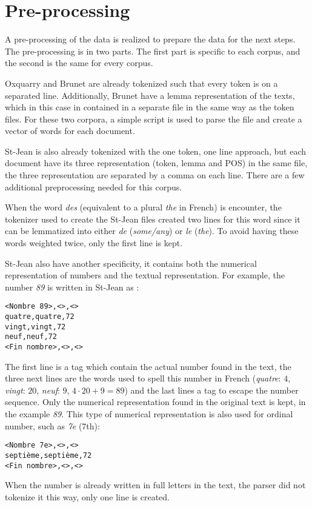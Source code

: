 \section{Pre-processing}

A pre-processing of the data is realized to prepare the data for the next steps.
The pre-processing is in two parts.
The first part is specific to each corpus, and the second is the same for every corpus.

Oxquarry and Brunet are already tokenized such that every token is on a separated line.
Additionally, Brunet have a lemma representation of the texts, which in this case in contained in a separate file in the same way as the token files.
For these two corpora, a simple script is used to parse the file and create a vector of words for each document.

St-Jean is also already tokenized with the one token, one line approach, but each document have its three representation (token, lemma and POS) in the same file, the three representation are separated by a comma on each line.
There are a few additional preprocessing needed for this corpus.

When the word \textit{des} (equivalent to a plural \textit{the} in French) is encounter, the tokenizer used to create the St-Jean files created two lines for this word since it can be lemmatized into either \textit{de} (\textit{some/any}) or \textit{le} (\textit{the}).
To avoid having these words weighted twice, only the first line is kept.

St-Jean also have another specificity, it contains both the numerical representation of numbers and the textual representation.
For example, the number \textit{89} is written in St-Jean as :
\begin{verbatim}
<Nombre 89>,<>,<>
quatre,quatre,72
vingt,vingt,72
neuf,neuf,72
<Fin nombre>,<>,<>
\end{verbatim}
The first line is a tag which contain the actual number found in the text, the three next lines are the words used to spell this number in French (\textit{quatre}: $4$, \textit{vingt}: $20$, \textit{neuf}: $9$, $4 \cdot 20 + 9 = 89$) and the last lines a tag to escape the number sequence.
Only the numerical representation found in the original text is kept, in the example \textit{89}.
This type of numerical representation is also used for ordinal number, such as \textit{7e} (7th):
\begin{verbatim}
<Nombre 7e>,<>,<>
septième,septième,72
<Fin nombre>,<>,<>
\end{verbatim}
When the number is already written in full letters in the text, the parser did not tokenize it this way, only one line is created.

